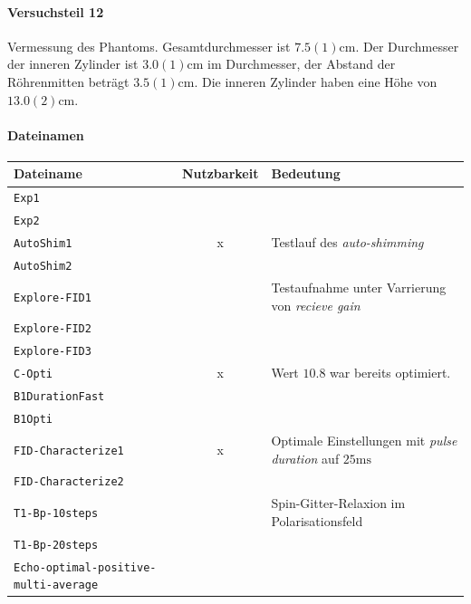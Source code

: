 \documentclass{subfiles}
\begin{document}
        \paragraph*{Versuchsteil 12}
            Vermessung des Phantoms. Gesamtdurchmesser ist $7.5(1)\si{\cm}$. Der Durchmesser der inneren Zylinder ist $3.0(1)\si{\cm}$ im Durchmesser, der Abstand der Röhrenmitten beträgt $3.5(1)\si{\cm}$. Die inneren Zylinder haben eine Höhe von $13.0(2)\si{\cm}$.

        \paragraph*{Dateinamen}

        \begin{table}[H]
            \centering
            \begin{tabular}{p{4cm}|c|p{6cm}}
                \textbf{Dateiname} & \textbf{Nutzbarkeit} & \textbf{Bedeutung} \\
                \hline\hline
                \texttt{Exp1} & & \\
                \texttt{Exp2} & & \\
                \hline
                \texttt{AutoShim1} & x & Testlauf des \emph{auto-shimming} \\
                \texttt{AutoShim2} & & \\
                \hline
                \texttt{Explore-FID1} & & Testaufnahme unter Varrierung von \emph{recieve gain} \\
                \texttt{Explore-FID2} & & \\
                \texttt{Explore-FID3} & & \\
                \hline
                \texttt{C-Opti} & x & Wert $10.8$ war bereits optimiert. \\
                \hline
                \texttt{B1DurationFast} & & \\
                \texttt{B1Opti} & & \\
                \hline
                \texttt{FID-Characterize1} & x & Optimale Einstellungen mit \emph{pulse duration} auf $25\si{\ms}$\\
                \texttt{FID-Characterize2} & & \\
                \hline
                \texttt{T1-Bp-10steps} & & Spin-Gitter-Relaxion im Polarisationsfeld \\
                \texttt{T1-Bp-20steps} & & \\
                \hline
                \texttt{Echo-optimal-}\texttt{positive-multi-average} & & \\
            \end{tabular}
        \end{table}
\end{document}
